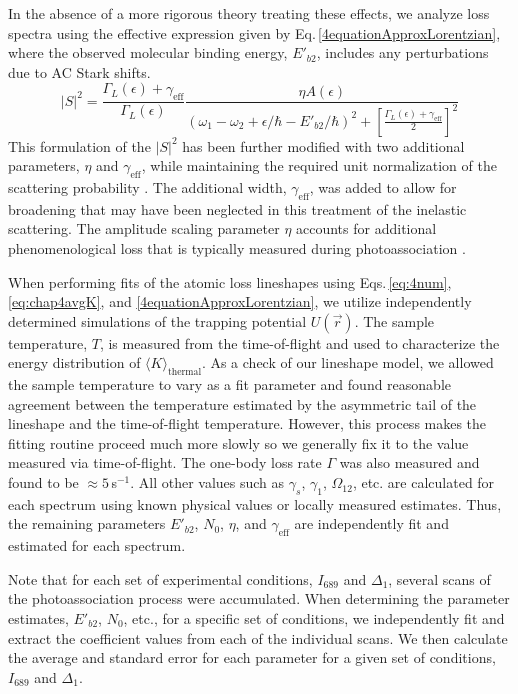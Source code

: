 In the absence of a more rigorous theory treating these effects, we analyze loss spectra using the effective expression given by Eq.\,\ref{4equationApproxLorentzian}, where the observed molecular binding energy, $E'_{b2}$, includes any perturbations due to AC Stark shifts.
\begin{equation}\label{4equationApproxLorentzian}
  \vert S \vert^2 = \frac{\Gamma_L(\epsilon)+\gamma_{\text{eff}}}{\Gamma_L(\epsilon)} \frac{\eta  A(\epsilon)} {\left(\omega_1-\omega_2+\epsilon/\hbar-E'_{b2}/\hbar\right)^2+\left[
  	\frac{\Gamma_L(\epsilon)+\gamma_{\text{eff}}}{2}\right]^2}
\end{equation}
This formulation of the $\vert S \vert^2$ has been further modified with two additional parameters, $\eta$ and $\gamma_{\text{eff}}$, while maintaining the required unit normalization of the scattering probability \cite{Quemener2012,Krems2009a}.
The additional width, $\gamma_{\text{eff}}$, was added to allow for broadening that may have been neglected in this treatment of the inelastic scattering.
The amplitude scaling parameter $\eta$ accounts for additional phenomenological loss that is typically measured during photoassociation \cite{Zelevinsky2006,Borkowski2014a,Kim2016,Nicholson2015a,Yan2013c,Theis2004,Blatt}.

When performing fits of the atomic loss lineshapes using Eqs.\,\ref{eq:4num}, \ref{eq:chap4avgK}, and \ref{4equationApproxLorentzian}, we utilize independently determined simulations of the trapping potential $U(\vec{r})$.
The sample temperature, $T$, is measured from the time-of-flight and used to characterize the energy distribution of $\langle K \rangle_\text{thermal}$.
As a check of our lineshape model, we allowed the sample temperature to vary as a fit parameter and found reasonable agreement between the temperature estimated by the asymmetric tail of the lineshape and the time-of-flight temperature.
However, this process makes the fitting routine proceed much more slowly so we generally fix it to the value measured via time-of-flight.
The one-body loss rate $\Gamma$ was also measured and found to be $\approx\!5$\,s$^{-1}$.
All other values such as $\gamma_s$, $\gamma_1$, $\Omega_{12}$, etc. are calculated for each spectrum using known physical values or locally measured estimates.
Thus, the remaining parameters $E'_{b2}$, $N_0$, $\eta$, and $\gamma_{\text{eff}}$ are independently fit and estimated for each spectrum.

Note that for each set of experimental conditions, $I_{689}$ and $\Delta_1$, several scans of the photoassociation process were accumulated. 
When determining the parameter estimates, $E'_{b2}$, $N_0$, etc., for a specific set of conditions, we independently fit and extract the coefficient values from each of the individual scans.
We then calculate the average and standard error for each parameter for a given set of conditions, $I_{689}$ and $\Delta_1$.

